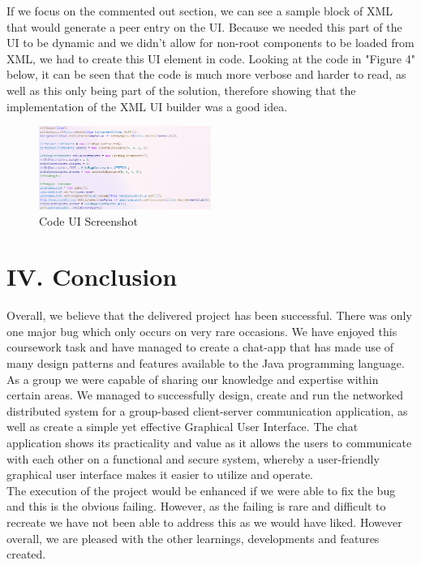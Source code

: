 \documentclass{COMPXXXX}
\begin{document}
\normalsize \textrm {If we focus on the commented out section, we can see a sample block of XML that would generate a peer entry on the UI. Because we needed this part of the UI to be dynamic and we didn't allow for non-root components to be loaded from XML, we had to create this UI element in code. Looking at the code in "Figure 4" below, it can be seen that the code is much more verbose and harder to read, as well as this only being part of the solution, therefore showing that the implementation of the XML UI builder was a good idea.}
\begin{figure}[h]
\centering
\includegraphics[width=0.5\textwidth]{code_ui.png}
\caption{Code UI Screenshot}
\label{fig:figure4}
\end{figure}

\section{IV. Conclusion}
\normalsize \textrm {Overall, we believe that the delivered project has been successful. There was only one major bug which only occurs on very rare occasions. We have enjoyed this coursework task and have managed to create a chat-app that has made use of many design patterns and features available to the Java programming language. As a group we were capable of sharing our knowledge and expertise within certain areas. We managed to successfully design, create and run the networked distributed system for a group-based client-server communication application, as well as create a simple yet effective Graphical User Interface. The chat application shows its practicality and value as it allows the users to communicate with each other on a functional and secure system, whereby a user-friendly graphical user interface makes it easier to utilize and operate.\\
The execution of the project would be enhanced if we were able to fix the bug and this is the obvious failing. However, as the failing is rare and difficult to recreate we have not been able to address this as we would have liked. However overall, we are pleased with the other learnings, developments and features created. }
\end{document}
